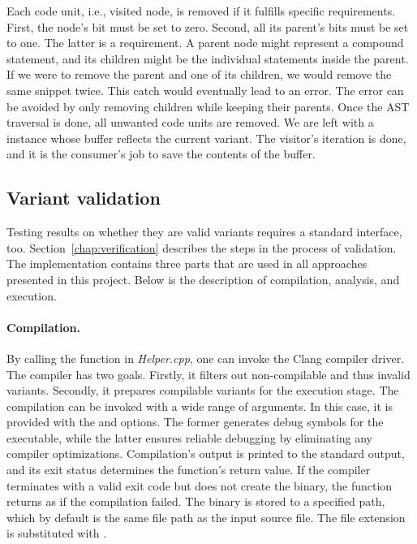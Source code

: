 Each code unit, i.e., visited node, is removed if it fulfills specific 
requirements. 
First, the node's bit must be set to zero. 
Second, all its parent's bits must be set to one. 
The latter is a  requirement. 
A parent node might represent a compound statement, and its children might 
be the individual statements inside the parent. 
If we were to remove the parent and one of its children, we would remove 
the same snippet twice. 
This catch would eventually lead to an error. 
The error can be avoided by only removing children while keeping their 
parents.
Once the AST traversal is done, all unwanted code units are removed. 
We are left with a  instance whose buffer reflects 
the current variant. 
The visitor's iteration is done, and it is the consumer's job to save 
the contents of the buffer.

\subsection*{Variant validation}

Testing results on whether they are valid variants requires a standard 
interface, too.
Section~\ref{chap:verification} describes the steps in the process 
of validation.
The implementation contains three parts that are used in all approaches 
presented in this project.
Below is the description of compilation, analysis, and execution.

\paragraph{Compilation.} By calling the  function in 
\emph{Helper.cpp}, one can invoke the Clang compiler driver.
The compiler has two goals.
Firstly, it filters out non-compilable and thus invalid variants.
Secondly, it prepares compilable variants for the execution stage.
The compilation can be invoked with a wide range of arguments.
In this case, it is provided with the  and  options.
The former generates debug symbols for the executable, while the latter 
ensures reliable debugging by eliminating any compiler optimizations.
Compilation's output is printed to the standard output, and its exit status 
determines the function's return value.
If the compiler terminates with a valid exit code but does not create 
the binary, the function returns as if the compilation failed.
The binary is stored to a specified path, which by default is the same file 
path as the input source file.
The file extension is substituted with .

